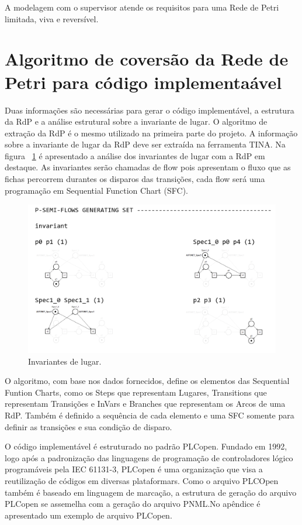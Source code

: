 A modelagem com o supervisor atende os requisitos para uma Rede de Petri limitada, viva e revers\'ivel.

\section{Algoritmo de covers\~ao da Rede de Petri para c\'odigo implementa\'avel}

Duas informa\c{c}\~oes s\~ao necess\'arias para gerar o c\'odigo implement\'avel, a estrutura da RdP e a an\'alise estrutural sobre a invariante de lugar. O algoritmo de extra\c{c}\~ao da RdP \'e o mesmo utilizado na primeira parte do projeto. A informa\c{c}\~ao sobre a invariante de lugar da RdP deve ser extra\'ida na ferramenta TINA. Na figura ~\ref{fig:pqnafabstruct} \'e apresentado a an\'alise dos invariantes de lugar com a RdP em destaque. As invariantes ser\~ao chamadas de flow pois apresentam o fluxo que as fichas percorrem durantes os disparos das transi\c{c}\~oes, cada flow ser\'a uma programa\c{c}\~ao em Sequential Function Chart (SFC).

\begin{figure}[!htb]
	\caption[Invariantes de lugar.]{Invariantes de lugar.}
	\label{fig:pqnafabstruct}
	\includegraphics[width=16cm]{./figuras/PQNAFABSTRUCT.png}\centering
\end{figure}

O algoritmo, com base nos dados fornecidos, define os elementos das Sequential Funtion Charts, como os Steps que representam Lugares, Transitions que representam Transi\c{c}\~oes e InVars e Branches que representam os Arcos de uma RdP. Tamb\'em \'e definido a sequ\^encia de cada elemento e uma SFC somente para definir as transi\c{c}\~oes e sua condi\c{c}\~ao de disparo.

O c\'odigo implement\'avel \'e estruturado no padr\~ao PLCopen. Fundado em 1992, logo ap\'os a padroniza\c{c}\~ao das linguagens de programa\c{c}\~ao de controladores l\'ogico program\'aveis pela IEC 61131-3, PLCopen \'e uma organiza\c{c}\~ao que visa a reutiliza\c{c}\~ao de c\'odigos em diversas plataformars. Como o arquivo PLCOpen tamb\'em \'e baseado em linguagem de marca\c{c}\~ao, a estrutura de gera\c{c}\~ao do arquivo PLCopen se assemelha com a gera\c{c}\~ao do arquivo PNML.No ap\^endice \'e apresentado um exemplo de arquivo PLCopen.


